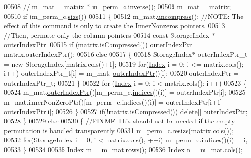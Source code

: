 \begin{DoxyCode}
00508   \textcolor{comment}{//   m\_mat = matrix * m\_perm\_c.inverse(); }
00509   m\_mat = matrix;
00510   \textcolor{keywordflow}{if} (m\_perm\_c.\hyperlink{group___core___module_a2216f9ce7b453ac39c46ff0323daeac9}{size}()) 
00511   \{
00512     m\_mat.\hyperlink{group___sparse_core___module_a7e560ebda035e992d2c99875cc7c3af3}{uncompress}(); \textcolor{comment}{//NOTE: The effect of this command is only to create the InnerNonzeros
       pointers.}
00513     \textcolor{comment}{//Then, permute only the column pointers}
00514     \textcolor{keyword}{const} StorageIndex * outerIndexPtr;
00515     \textcolor{keywordflow}{if} (matrix.isCompressed()) outerIndexPtr = matrix.outerIndexPtr();
00516     \textcolor{keywordflow}{else}
00517     \{
00518       StorageIndex* outerIndexPtr\_t = \textcolor{keyword}{new} StorageIndex[matrix.cols()+1];
00519       \textcolor{keywordflow}{for}(\hyperlink{namespace_eigen_a62e77e0933482dafde8fe197d9a2cfde}{Index} i = 0; i <= matrix.cols(); i++) outerIndexPtr\_t[i] = m\_mat.
      \hyperlink{group___sparse_core___module_a75506964d86d6badb32d0b4917acf2e2}{outerIndexPtr}()[i];
00520       outerIndexPtr = outerIndexPtr\_t;
00521     \}
00522     \textcolor{keywordflow}{for} (\hyperlink{namespace_eigen_a62e77e0933482dafde8fe197d9a2cfde}{Index} i = 0; i < matrix.cols(); i++)
00523     \{
00524       m\_mat.\hyperlink{group___sparse_core___module_a75506964d86d6badb32d0b4917acf2e2}{outerIndexPtr}()[m\_perm\_c.\hyperlink{group___core___module_a2f1ab379207fcd1ceb33941e25cf50c2}{indices}()(i)] = outerIndexPtr[i];
00525       m\_mat.\hyperlink{group___sparse_core___module_a218204b051a24f579c394454786eeda0}{innerNonZeroPtr}()[m\_perm\_c.\hyperlink{group___core___module_a2f1ab379207fcd1ceb33941e25cf50c2}{indices}()(i)] = outerIndexPtr[i+1] - 
      outerIndexPtr[i];
00526     \}
00527     \textcolor{keywordflow}{if}(!matrix.isCompressed()) \textcolor{keyword}{delete}[] outerIndexPtr;
00528   \} 
00529   \textcolor{keywordflow}{else} 
00530   \{ \textcolor{comment}{//FIXME This should not be needed if the empty permutation is handled transparently}
00531     m\_perm\_c.\hyperlink{group___core___module_a0e0fda6e84d69e02432e4770359bb532}{resize}(matrix.cols());
00532     \textcolor{keywordflow}{for}(StorageIndex i = 0; i < matrix.cols(); ++i) m\_perm\_c.\hyperlink{group___core___module_a2f1ab379207fcd1ceb33941e25cf50c2}{indices}()(i) = i;
00533   \}
00534   
00535   \hyperlink{namespace_eigen_a62e77e0933482dafde8fe197d9a2cfde}{Index} m = m\_mat.\hyperlink{group___sparse_core___module_a62e61bb861eee306d5b069ce652b5aa5}{rows}();
00536   \hyperlink{namespace_eigen_a62e77e0933482dafde8fe197d9a2cfde}{Index} n = m\_mat.\hyperlink{group___sparse_core___module_aa391750e3c530227e4a5c3c52e959975}{cols}();

\end{DoxyCode}
